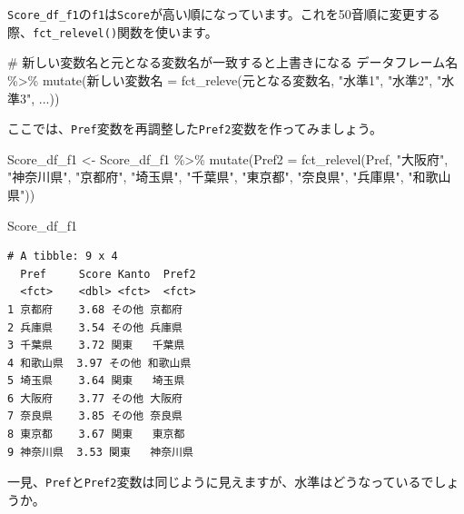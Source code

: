 \documentclass[
  a4paper,
  pandoc,
  ja=standard,
  jafont=haranoaji]{bxjsbook}
\newenvironment{Shaded}{\begin{snugshade}}{\end{snugshade}}
\newcommand{\AttributeTok}[1]{\textcolor[rgb]{0.00,0.48,0.65}{#1}}
\newcommand{\CommentTok}[1]{\textcolor[rgb]{0.37,0.37,0.37}{#1}}
\newcommand{\FunctionTok}[1]{\textcolor[rgb]{0.28,0.35,0.67}{#1}}
\newcommand{\NormalTok}[1]{\textcolor[rgb]{0.00,0.48,0.65}{#1}}
\newcommand{\OtherTok}[1]{\textcolor[rgb]{0.00,0.48,0.65}{#1}}
\newcommand{\SpecialCharTok}[1]{\textcolor[rgb]{0.37,0.37,0.37}{#1}}
\newcommand{\StringTok}[1]{\textcolor[rgb]{0.13,0.47,0.30}{#1}}
\begin{document}
\texttt{Score\_df\_f1}の\texttt{f1}は\texttt{Score}が高い順になっています。これを50音順に変更する際、\texttt{fct\_relevel()}関数を使います。

\begin{Shaded}
\begin{Highlighting}[numbers=left,,]
\CommentTok{\# 新しい変数名と元となる変数名が一致すると上書きになる}
\NormalTok{データフレーム名 }\SpecialCharTok{\%\textgreater{}\%}
  \FunctionTok{mutate}\NormalTok{(新しい変数名 }\OtherTok{=} \FunctionTok{fct\_releve}\NormalTok{(元となる変数名, }
                                    \StringTok{"水準1"}\NormalTok{, }\StringTok{"水準2"}\NormalTok{, }\StringTok{"水準3"}\NormalTok{, ...))}
\end{Highlighting}
\end{Shaded}

ここでは、\texttt{Pref}変数を再調整した\texttt{Pref2}変数を作ってみましょう。

\begin{Shaded}
\begin{Highlighting}[numbers=left,,]
\NormalTok{Score\_df\_f1 }\OtherTok{\textless{}{-}}\NormalTok{ Score\_df\_f1 }\SpecialCharTok{\%\textgreater{}\%}
  \FunctionTok{mutate}\NormalTok{(}\AttributeTok{Pref2 =} \FunctionTok{fct\_relevel}\NormalTok{(Pref, }\StringTok{"大阪府"}\NormalTok{, }\StringTok{"神奈川県"}\NormalTok{, }\StringTok{"京都府"}\NormalTok{, }
                             \StringTok{"埼玉県"}\NormalTok{, }\StringTok{"千葉県"}\NormalTok{, }\StringTok{"東京都"}\NormalTok{, }
                             \StringTok{"奈良県"}\NormalTok{, }\StringTok{"兵庫県"}\NormalTok{, }\StringTok{"和歌山県"}\NormalTok{))}

\NormalTok{Score\_df\_f1}
\end{Highlighting}
\end{Shaded}

\begin{verbatim}
# A tibble: 9 x 4
  Pref     Score Kanto  Pref2   
  <fct>    <dbl> <fct>  <fct>   
1 京都府    3.68 その他 京都府  
2 兵庫県    3.54 その他 兵庫県  
3 千葉県    3.72 関東   千葉県  
4 和歌山県  3.97 その他 和歌山県
5 埼玉県    3.64 関東   埼玉県  
6 大阪府    3.77 その他 大阪府  
7 奈良県    3.85 その他 奈良県  
8 東京都    3.67 関東   東京都  
9 神奈川県  3.53 関東   神奈川県
\end{verbatim}

一見、\texttt{Pref}と\texttt{Pref2}変数は同じように見えますが、水準はどうなっているでしょうか。

\begin{Shaded}
\end{Shaded}
\end{document}
